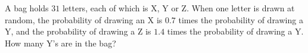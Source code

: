 A bag holds $31$ letters, each of which is X, Y or Z. When one letter is drawn at random, the probability of drawing an X is $0.7$ times the probability of drawing a Y, and the probability of drawing a Z is $1.4$ times the probability of drawing a Y. How many Y's are in the bag?
